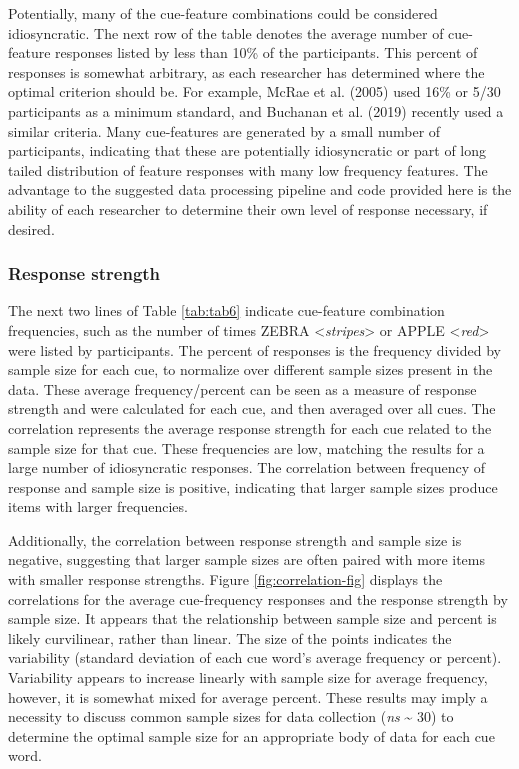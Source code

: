 \documentclass[man]{apa6}
\begin{document}
Potentially, many of the cue-feature combinations could be considered idiosyncratic. The next row of the table denotes the average number of cue-feature responses listed by less than 10\% of the participants. This percent of responses is somewhat arbitrary, as each researcher has determined where the optimal criterion should be. For example, McRae et al. (2005) used 16\% or 5/30 participants as a minimum standard, and Buchanan et al. (2019) recently used a similar criteria. Many cue-features are generated by a small number of participants, indicating that these are potentially idiosyncratic or part of long tailed distribution of feature responses with many low frequency features. The advantage to the suggested data processing pipeline and code provided here is the ability of each researcher to determine their own level of response necessary, if desired.

\hypertarget{response-strength}{%
\subsubsection{Response strength}\label{response-strength}}

The next two lines of Table \ref{tab:tab6} indicate cue-feature combination frequencies, such as the number of times ZEBRA \textless{}\emph{stripes}\textgreater{} or APPLE \textless{}\emph{red}\textgreater{} were listed by participants. The percent of responses is the frequency divided by sample size for each cue, to normalize over different sample sizes present in the data. These average frequency/percent can be seen as a measure of response strength and were calculated for each cue, and then averaged over all cues. The correlation represents the average response strength for each cue related to the sample size for that cue. These frequencies are low, matching the results for a large number of idiosyncratic responses. The correlation between frequency of response and sample size is positive, indicating that larger sample sizes produce items with larger frequencies.

Additionally, the correlation between response strength and sample size is negative, suggesting that larger sample sizes are often paired with more items with smaller response strengths. Figure \ref{fig:correlation-fig} displays the correlations for the average cue-frequency responses and the response strength by sample size. It appears that the relationship between sample size and percent is likely curvilinear, rather than linear. The size of the points indicates the variability (standard deviation of each cue word's average frequency or percent). Variability appears to increase linearly with sample size for average frequency, however, it is somewhat mixed for average percent. These results may imply a necessity to discuss common sample sizes for data collection (\emph{ns} \textasciitilde{} 30) to determine the optimal sample size for an appropriate body of data for each cue word.
\end{document}
